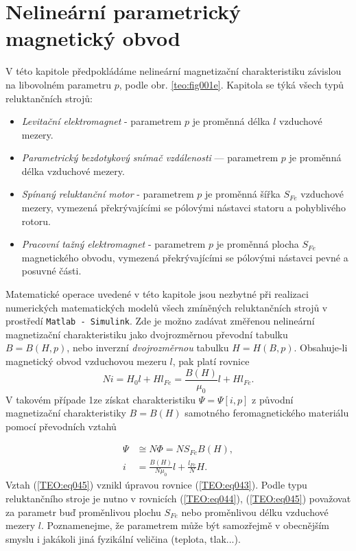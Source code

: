 {  \section{Nelineární parametrický magnetický obvod}
    V této kapitole předpokládáme nelineární magnetizační charakteristiku závislou na libovolném 
    parametru \(p\), podle obr. \ref{teo:fig001e}. Kapitola se týká všech typů reluktančních strojů:
    \begin{itemize}
      \item  \emph{Levitační elektromagnet} - parametrem \(p\) je proměnná délka \(l\) vzduchové 
             mezery.
      \item \emph{Parametrický bezdotykový snímač vzdálenosti} — parametrem \(p\) je proměnná délka 
            vzduchové mezery.
      \item \emph{Spínaný reluktanční motor} - parametrem \(p\) je proměnná šířka \(S_{Fe}\) 
            vzduchové mezery, vymezená překrývajícími se pólovými nástavci statoru a pohyblivého 
            rotoru.
      \item \emph{Pracovní tažný elektromagnet} - parametrem \(p\) je proměnná plocha \(S_{Fe}\)    
            magnetického obvodu, vymezená překrývajícími se pólovými nástavci pevné a posuvné části.
    \end{itemize}
    
    Matematické operace uvedené v této kapitole jsou nezbytné při realizaci numerických 
    matematických modelů všech zmíněných reluktančních strojů v prostředí \texttt{Matlab - 
    Simulink}. Zde je možno zadávat změřenou nelineární magnetizační charakteristiku jako 
    dvojrozměrnou převodní tabulku \(B = B(H,p)\), nebo inverzní \emph{dvojrozměrnou} tabulku \(H = 
    H(B, p)\). Obsahuje-li magnetický obvod vzduchovou mezeru \(l\), pak platí rovnice
    \begin{equation}\label{TEO:eq043}
      Ni = H_0l + Hl_{Fe} = \frac{B(H)}{\mu_0}l + Hl_{Fe}.
    \end{equation}
    V takovém případe 1ze získat charakteristiku \(\Psi = \Psi[i,p]\) z původní magnetizační 
    charakteristiky \(B=B(H)\) samotného feromagnetického materiálu pomocí převodních vztahů

    \begin{align}
      \Psi &\cong N\Phi = NS_{Fe}B(H),                       \label{TEO:eq044} \\
         i &= \frac{B(H)}{N\mu_0}l + \frac{l_{Fe}}{N}H.      \label{TEO:eq045}
    \end{align} 
    Vztah (\ref{TEO:eq045}) vznikl úpravou rovnice (\ref{TEO:eq043}). Podle typu reluktančního 
    stroje je nutno v rovnicích (\ref{TEO:eq044}), (\ref{TEO:eq045}) považovat za parametr buď 
    proměnlivou plochu \(S_{Fe}\) nebo proměnlivou délku vzduchové mezery \(l\). Poznamenejme, že 
    parametrem může být samozřejmě v obecnějším smyslu i jakákoli jiná fyzikální veličina (teplota, 
    tlak...).

}
